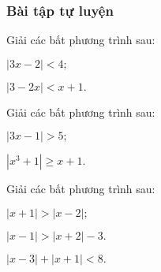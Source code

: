 \subsubsection{Bài tập tự luyện}

\begin{bt}%
	Giải các bất phương trình sau:
\begin{enumEX}{2}
	\item $ \left| 3x-2\right| <4; $
	\item $ \left| 3-2x\right| <x+1. $	
\end{enumEX}
\end{bt}

\begin{bt}%
	Giải các bất phương trình sau:
	\begin{enumEX}{2}
		\item $ \left| 3x-1\right| >5; $
		\item $ \left| x^3+1\right| \ge x+1. $	
	\end{enumEX}
\end{bt}

\begin{bt}%
	Giải các bất phương trình sau:
	\begin{enumEX}{2}
		\item $ \left| x+1\right| >\left| x-2\right| ; $
		\item $ \left| x-1\right| >\left| x+2\right| -3. $
		\item $ \left|x-3\right|+\left| x+1\right| <8. $	
	\end{enumEX}
\end{bt}

